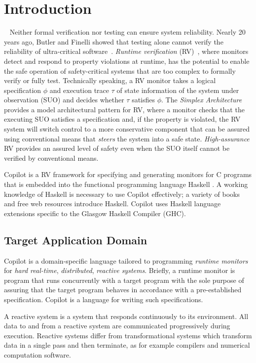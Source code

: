 
\section{Introduction} \label{sec:introduction}

 
Neither formal verification nor testing can ensure system reliability.
Nearly 20 years ago, Butler and Finelli showed that testing alone cannot verify
the reliability of ultra-critical software~\cite{butler}.
\emph{Runtime verification} (RV)~\cite{monitors}, where monitors
detect and respond to property violations at runtime, has the
potential to enable the safe operation of safety-critical systems that
are too complex to formally verify or fully test.  Technically
speaking, a RV monitor takes a logical specification $\phi$ and
execution trace $\tau$ of state information of the system under
observation (SUO) and decides whether $\tau$ satisfies $\phi$. The
\emph{Simplex Architecture}~\cite{simplex} provides a model
architectural pattern for RV, where a monitor checks that the
executing SUO satisfies a specification and, if the property is
violated, the RV system will switch control to a more conservative
component that can be assured using conventional means that
\emph{steers} the system into a safe state.  \emph{High-assurance} RV
provides an assured level of safety even when the SUO itself cannot be
verified by conventional means.


Copilot is a RV framework for specifying and generating monitors for C programs that is
embedded into the functional programming language Haskell
\cite{PeytonJones02}.  A working knowledge of Haskell is necessary to use
Copilot effectively; a variety of books and free web resources introduce Haskell.
Copilot uses Haskell language extensions
specific to the Glasgow Haskell Compiler (GHC).

\subsection{Target Application Domain} \label{domain}


Copilot is a domain-specific language tailored to programming \emph{runtime
monitors} for \emph{hard real-time}, \emph{distributed}, \emph{reactive systems}.
Briefly, a runtime monitor is program that runs concurrently with a target program
with the sole purpose of assuring that the target program behaves in accordance with a
pre-established specification. Copilot is a language for writing such specifications.

A reactive system is a system that responds continuously to its environment.
All data to and from a reactive system are communicated progressively during
execution. Reactive systems differ from transformational systems which transform
data in a single pass and then terminate, as for example compilers and numerical
computation software.

